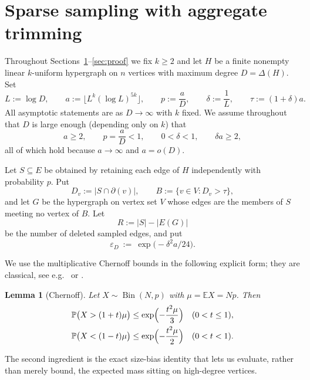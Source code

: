\documentclass[10pt,a4paper]{amsart}
\newtheorem{lemma}[theorem]{Lemma}
\newcommand{\VV}{V}
\newcommand{\EE}{E}
\newcommand{\PP}{\mathbb{P}}
\newcommand{\EX}{\mathbb{E}}
\newcommand{\Bin}{\operatorname{Bin}}
\newcommand{\dg}{\partial}
\newcommand{\Deltaop}{\Delta}
\begin{document}
\section{Sparse sampling with aggregate trimming}
\label{sec:trim}

Throughout Sections~\ref{sec:trim}--\ref{sec:proof} we fix $k\ge2$ and let $H$ be a
finite nonempty linear $k$-uniform hypergraph on $n$ vertices with maximum degree
$D=\Deltaop(H)$. Set
\begin{equation}
\label{eq:params}
  L:=\log D,\qquad
  a:=\bigl\lfloor L^k(\log L)^{5k}\bigr\rfloor,\qquad
  p:=\frac{a}{D},\qquad
  \delta:=\frac1L,\qquad
  \tau:=(1+\delta)a .
\end{equation}
All asymptotic statements are as $D\to\infty$ with $k$ fixed. We assume throughout that
$D$ is large enough (depending only on $k$) that
\begin{equation}
\label{eq:dlarge}
  a\ge2,\qquad p=\frac{a}{D}<1,\qquad 0<\delta<1,\qquad
  \delta a\ge 2 ,
\end{equation}
all of which hold because $a\to\infty$ and $a=o(D)$.

Let $S\subseteq \EE$ be obtained by retaining each edge of $H$ independently with
probability $p$. Put
\[
  D_v:=|S\cap\dg(v)|,\qquad
  B:=\{v\in \VV: D_v>\tau\},
\]
and let $G$ be the hypergraph on vertex set $\VV$ whose edges are the members of $S$
meeting no vertex of $B$. Let
\[
  R:=|S|-|E(G)|
\]
be the number of deleted sampled edges, and put
\begin{equation}
\label{eq:eps}
  \varepsilon_D\ :=\ \exp\bigl(-\delta^2a/24\bigr).
\end{equation}

We use the multiplicative Chernoff bounds in the following explicit form; they are
classical, see e.g.\ \cite[\S2.1]{JLR} or \cite[Appendix A]{AlonSpencer}.

\begin{lemma}[Chernoff]
\label{lem:chernoff}
Let $X\sim\Bin(N,p)$ with $\mu=\EX X=Np$. Then
\[
\begin{aligned}
  \PP\bigl(X>(1+t)\mu\bigr)&\le \exp\Bigl(-\frac{t^2\mu}{3}\Bigr)
    &&(0<t\le1),\\
  \PP\bigl(X<(1-t)\mu\bigr)&\le \exp\Bigl(-\frac{t^2\mu}{2}\Bigr)
    &&(0<t<1).
\end{aligned}
\]
\end{lemma}

The second ingredient is the exact size-bias identity that lets us evaluate, rather than
merely bound, the expected mass sitting on high-degree vertices.
\end{document}

